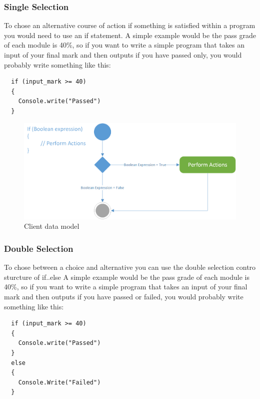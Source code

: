 \documentclass[
]{book}
\begin{document}
\hypertarget{single-selection}{%
\subsubsection{Single Selection}\label{single-selection}}

To chose an alternative course of action if something is satisfied within a program you would need to use an if statement. A simple example would be the pass grade of each module is 40\%, so if you want to write a simple program that takes an input of your final mark and then outputs if you have passed only, you would probably write something like this:

\begin{verbatim}
  if (input_mark >= 40)
  {
    Console.write("Passed")
  }
\end{verbatim}

\begin{figure}

{\centering \includegraphics[width=1\linewidth]{images/basic_if} 

}

\caption{Client data model}\label{fig:unnamed-chunk-7}
\end{figure}

\hypertarget{double-selection}{%
\subsubsection{Double Selection}\label{double-selection}}

To chose between a choice and alternative you can use the double selection contro sturcture of if..else
A simple example would be the pass grade of each module is 40\%, so if you want to write a simple program that takes an input of your final mark and then outputs if you have passed or failed, you would probably write something like this:

\begin{verbatim}
  if (input_mark >= 40)
  {
    Console.write("Passed")
  }
  else
  {
    Console.Write("Failed")
  }
\end{verbatim}
\end{document}
